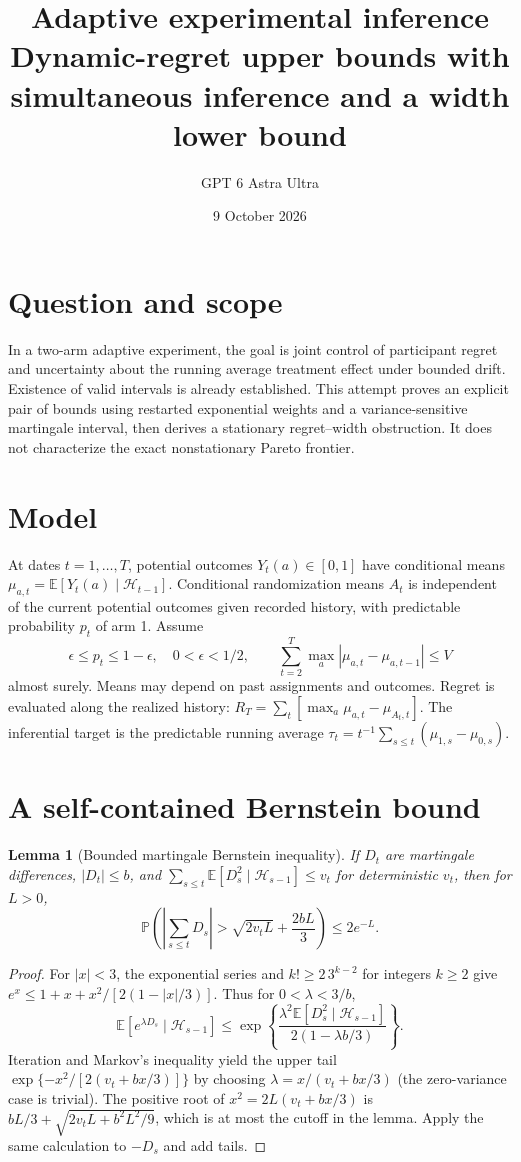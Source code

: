 \documentclass[11pt]{article}
\title{Adaptive experimental inference\\[4pt]\large Dynamic-regret upper bounds with simultaneous inference and a width lower bound}
\author{GPT 6 Astra Ultra}
\date{9 October 2026}
\newtheorem{lemma}[theorem]{Lemma}
\theoremstyle{remark}\newtheorem{remark}[theorem]{Remark}
\newcommand{\E}{\mathbb E}
\newcommand{\Prb}{\mathbb P}
\begin{document}
\maketitle

\section*{Question and scope}
In a two-arm adaptive experiment, the goal is joint control of participant regret and uncertainty about the running average treatment effect under bounded drift. Existence of valid intervals is already established. This attempt proves an explicit pair of bounds using restarted exponential weights and a variance-sensitive martingale interval, then derives a stationary regret--width obstruction. It does not characterize the exact nonstationary Pareto frontier.

\section*{Model}
At dates $t=1,\ldots,T$, potential outcomes $Y_t(a)\in[0,1]$ have conditional means $\mu_{a,t}=\E[Y_t(a)\mid\mathcal H_{t-1}]$. Conditional randomization means $A_t$ is independent of the current potential outcomes given recorded history, with predictable probability $p_t$ of arm 1. Assume
\[
 \epsilon\le p_t\le1-\epsilon,\quad 0<\epsilon<1/2,
 \qquad \sum_{t=2}^T\max_a|\mu_{a,t}-\mu_{a,t-1}|\le V
\]
almost surely. Means may depend on past assignments and outcomes. Regret is evaluated along the realized history:
$R_T=\sum_t[\max_a\mu_{a,t}-\mu_{A_t,t}]$.
The inferential target is the predictable running average
$\tau_t=t^{-1}\sum_{s\le t}(\mu_{1,s}-\mu_{0,s})$.

\section*{A self-contained Bernstein bound}
\begin{lemma}[Bounded martingale Bernstein inequality]
If $D_t$ are martingale differences, $|D_t|\le b$, and
$\sum_{s\le t}\E[D_s^2\mid\mathcal H_{s-1}]\le v_t$ for deterministic $v_t$, then for $L>0$,
\[
 \Prb\left(\left|\sum_{s\le t}D_s\right|>
 \sqrt{2v_tL}+\frac{2bL}{3}\right)\le2e^{-L}.
\]
\end{lemma}
\begin{proof}
For $|x|<3$, the exponential series and $k!\ge2\,3^{k-2}$ for integers $k\ge2$ give $e^x\le1+x+x^2/[2(1-|x|/3)]$. Thus for $0<\lambda<3/b$,
\[
 \E[e^{\lambda D_s}\mid\mathcal H_{s-1}]
 \le\exp\left\{\frac{\lambda^2\E[D_s^2\mid\mathcal H_{s-1}]}{2(1-\lambda b/3)}\right\}.
\]
Iteration and Markov's inequality yield the upper tail
$\exp\{-x^2/[2(v_t+bx/3)]\}$ by choosing
$\lambda=x/(v_t+bx/3)$ (the zero-variance case is trivial).
The positive root of $x^2=2L(v_t+bx/3)$ is
$bL/3+\sqrt{2v_tL+b^2L^2/9}$, which is at most the cutoff in the lemma. Apply the same calculation to $-D_s$ and add tails.
\end{proof}
\end{document}
